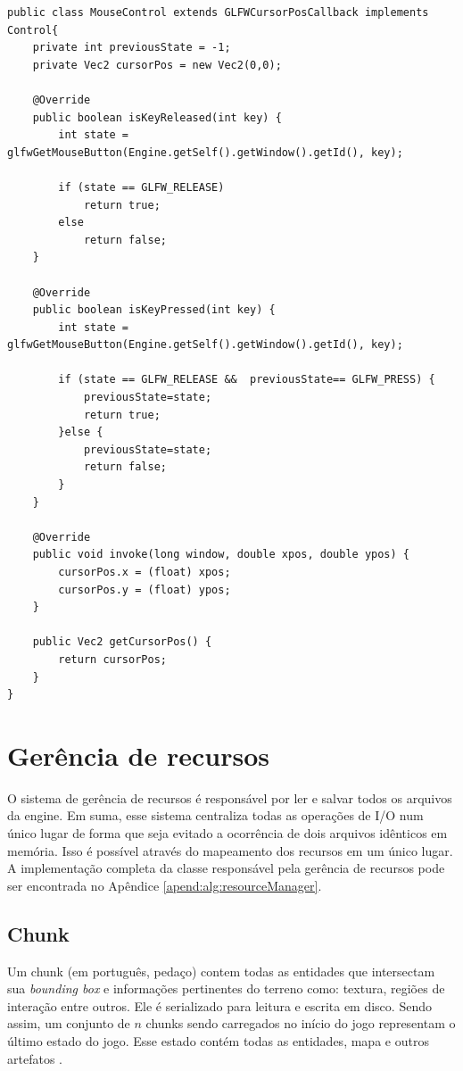 \documentclass[12pt, 
openright, 
oneside, 
a4paper,    
brazil]{facom-ufu-abntex2}
\begin{document}
\begin{lstlisting}[caption=Mouse input, label={alg:GLFWMouse}]
public class MouseControl extends GLFWCursorPosCallback implements Control{
    private int previousState = -1;
    private Vec2 cursorPos = new Vec2(0,0);
     
    @Override
    public boolean isKeyReleased(int key) {
        int state = glfwGetMouseButton(Engine.getSelf().getWindow().getId(), key);
         
        if (state == GLFW_RELEASE) 
            return true;
        else
            return false;
    }
 
    @Override
    public boolean isKeyPressed(int key) {
        int state = glfwGetMouseButton(Engine.getSelf().getWindow().getId(), key);
         
        if (state == GLFW_RELEASE &&  previousState== GLFW_PRESS) {
            previousState=state;
            return true;
        }else {
            previousState=state;
            return false;
        }
    }
 
    @Override
    public void invoke(long window, double xpos, double ypos) {
        cursorPos.x = (float) xpos;
        cursorPos.y = (float) ypos;
    }
 
    public Vec2 getCursorPos() {
        return cursorPos;
    }
}
\end{lstlisting}


\section{Gerência de recursos}
O sistema de gerência de recursos é responsável por ler e salvar todos os arquivos da engine. Em suma, esse sistema centraliza todas as operações de I/O num único lugar de forma que seja evitado a ocorrência de dois arquivos idênticos em memória. Isso é possível através do mapeamento dos recursos em um único lugar. A implementação completa da classe responsável pela gerência de recursos pode ser encontrada no Apêndice \ref{apend:alg:resourceManager}.


\subsection{Chunk}
Um chunk (em português, pedaço) contem todas as entidades que intersectam sua \textit{bounding box} e informações pertinentes do terreno como: textura, regiões de interação entre outros. Ele é serializado para leitura e escrita em disco. Sendo assim, um conjunto de $n$ chunks sendo carregados no início do jogo representam o último estado do jogo. Esse estado contém todas as entidades, mapa e outros artefatos  .
\end{document}
